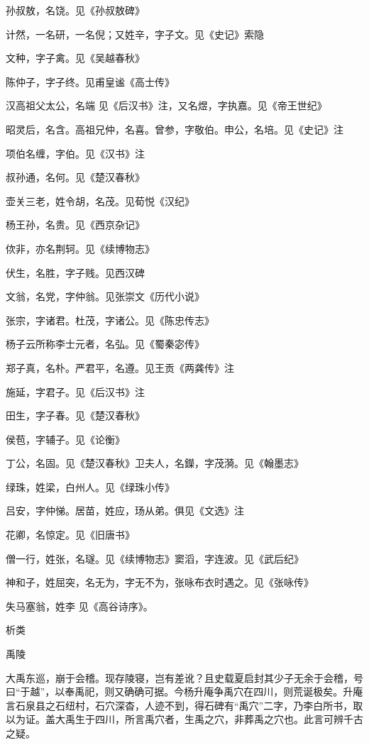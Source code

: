 \documentclass[a4paper,12pt,UTF8,twoside]{ctexbook}
\begin{document}
    孙叔敖，名饶。见《孙叔敖碑》
    
    计然，一名研，一名倪；又姓辛，字子文。见《史记》索隐
    
    文种，字子禽。见《吴越春秋》
    
    陈仲子，字子终。见甫皇谧《高士传》
    
    汉高祖父太公，名端 见《后汉书》注，又名煜，字执嘉。见《帝王世纪》
    
    昭灵后，名含。高祖兄仲，名喜。曾参，字敬伯。申公，名培。见《史记》注
    
    项伯名缠，字伯。见《汉书》注
    
    叔孙通，名何。见《楚汉春秋》
    
    壶关三老，姓令胡，名茂。见荀悦《汉纪》
    
    杨王孙，名贵。见《西京杂记》
    
    佽非，亦名荆轲。见《续博物志》
    
    伏生，名胜，字子贱。见西汉碑
    
    文翁，名党，字仲翁。见张崇文《历代小说》
    
    张宗，字诸君。杜茂，字诸公。见《陈忠传志》
    
    杨子云所称李士元者，名弘。见《蜀秦宓传》
    
    郑子真，名朴。严君平，名遵。见王贡《两龚传》注
    
    施延，字君子。见《后汉书》注
    
    田生，字子春。见《楚汉春秋》
    
    侯苞，字辅子。见《论衡》
    
    丁公，名固。见《楚汉春秋》卫夫人，名鑅，字茂漪。见《翰墨志》
    
    绿珠，姓梁，白州人。见《绿珠小传》
    
    吕安，字仲悌。居苗，姓应，玚从弟。俱见《文选》注
    
    花卿，名惊定。见《旧唐书》
    
    僧一行，姓张，名璲。见《续博物志》窦滔，字连波。见《武后纪》
    
    神和子，姓屈突，名无为，字无不为，张咏布衣时遇之。见《张咏传》
    
    失马塞翁，姓李 见《高谷诗序》。
    
    析类
    
    禹陵
    
    大禹东巡，崩于会稽。现存陵寝，岂有差讹？且史载夏启封其少子无余于会稽，号曰“于越”，以奉禹祀，则又确确可据。今杨升庵争禹穴在四川，则荒诞极矣。升庵言石泉县之石纽村，石穴深杳，人迹不到，得石碑有“禹穴”二字，乃李白所书，取以为证。盖大禹生于四川，所言禹穴者，生禹之穴，非葬禹之穴也。此言可辨千古之疑。
    
\end{document}
